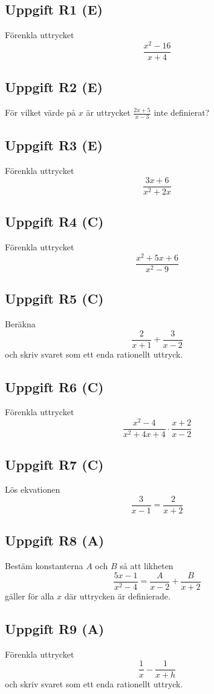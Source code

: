 \documentclass[12pt]{article}
\begin{document}
\subsection*{Uppgift R1 (E)}
Förenkla uttrycket
\[
\frac{x^2 - 16}{x + 4}
\]

\subsection*{Uppgift R2 (E)}
För vilket värde på $x$ är uttrycket $\frac{2x + 5}{x - 3}$ inte definierat?

\subsection*{Uppgift R3 (E)}
Förenkla uttrycket
\[
\frac{3x + 6}{x^2 + 2x}
\]

\subsection*{Uppgift R4 (C)}
Förenkla uttrycket
\[
\frac{x^2 + 5x + 6}{x^2 - 9}
\]

\subsection*{Uppgift R5 (C)}
Beräkna
\[
\frac{2}{x + 1} + \frac{3}{x - 2}
\]
och skriv svaret som ett enda rationellt uttryck.

\subsection*{Uppgift R6 (C)}
Förenkla uttrycket
\[
\frac{x^2 - 4}{x^2 + 4x + 4} \cdot \frac{x + 2}{x - 2}
\]

\subsection*{Uppgift R7 (C)}
Lös ekvationen
\[
\frac{3}{x - 1} = \frac{2}{x + 2}
\]

\subsection*{Uppgift R8 (A)}
Bestäm konstanterna $A$ och $B$ så att likheten
\[
\frac{5x - 1}{x^2 - 4} = \frac{A}{x - 2} + \frac{B}{x + 2}
\]
gäller för alla $x$ där uttrycken är definierade.

\subsection*{Uppgift R9 (A)}
Förenkla uttrycket
\[
\frac{1}{x} - \frac{1}{x + h}
\]
och skriv svaret som ett enda rationellt uttryck.
\end{document}
